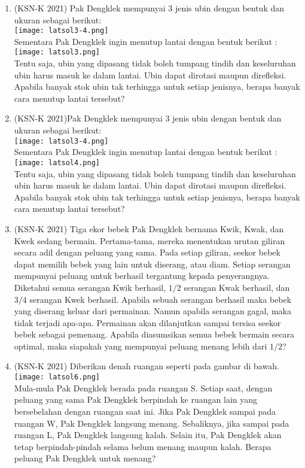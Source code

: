 \documentclass[11pt]{scrartcl}
\begin{document}
\begin{enumerate}
	 	    \item (KSN-K 2021) Pak Dengklek mempunyai 3 jenis ubin dengan bentuk dan ukuran sebagai berikut:\\
	 	    	\texttt{[image: latsol3-4.png]}\\
	 	    Sementara Pak Dengklek ingin menutup lantai dengan bentuk berikut :\\
	 	    	\texttt{[image: latsol3.png]}\\
	 	    Tentu saja, ubin yang dipasang tidak boleh tumpang tindih dan keseluruhan ubin harus 
	 	    masuk ke dalam lantai. Ubin dapat dirotasi maupun direfleksi. Apabila banyak stok ubin 
	 	    tak terhingga untuk setiap jenisnya, berapa banyak cara menutup lantai tersebut?
	 	    
	 	    \item (KSN-K 2021)Pak Dengklek mempunyai 3 jenis ubin dengan bentuk dan ukuran sebagai berikut:\\
	 	     	 \texttt{[image: latsol3-4.png]}\\
	 	    Sementara Pak Dengklek ingin menutup lantai dengan bentuk berikut :\\
	 	    	\texttt{[image: latsol4.png]}\\
	 	    Tentu saja, ubin yang dipasang tidak boleh tumpang tindih dan keseluruhan ubin harus 
	 	    masuk ke dalam lantai. Ubin dapat dirotasi maupun direfleksi. Apabila banyak stok ubin 
	 	    tak terhingga untuk setiap jenisnya, berapa banyak cara menutup lantai tersebut?
	 	    
	 	    \item (KSN-K 2021) Tiga ekor bebek Pak Dengklek bernama Kwik, Kwak, dan Kwek sedang bermain. 
	 	    Pertama-tama, mereka menentukan urutan giliran secara adil dengan peluang yang 
	 	    sama. Pada setiap giliran, seekor bebek dapat memilih bebek yang lain untuk diserang,
	 	    atau diam. Setiap serangan mempunyai peluang untuk berhasil tergantung kepada
	 	    penyerangnya. Diketahui semua serangan Kwik berhasil, $1/2$ serangan Kwak berhasil, dan 
	 	    $3/4$ serangan Kwek berhasil. Apabila sebuah serangan berhasil maka bebek yang diserang 
	 	    keluar dari permainan. Namun apabila serangan gagal, maka tidak terjadi apa-apa.
	 	    Permainan akan dilanjutkan sampai tersisa seekor bebek sebagai pemenang. Apabila 
	 	    diasumsikan semua bebek bermain secara optimal, maka siapakah yang mempunyai 
	 	    peluang menang lebih dari $1/2$?
	 	    
	 	    \item (KSN-K 2021) Diberikan denah ruangan seperti pada gambar di bawah.\\
	 	    	\texttt{[image: latsol6.png]}\\
	 	    Mula-mula Pak Dengklek berada pada ruangan S. Setiap saat, dengan peluang yang 
	 	    sama Pak Dengklek berpindah ke ruangan lain yang bersebelahan dengan ruangan saat 
	 	    ini. Jika Pak Dengklek sampai pada ruangan W, Pak Dengklek langsung menang. 
	 	    Sebaliknya, jika sampai pada ruangan L, Pak Dengklek langsung kalah. Selain itu, Pak 
	 	    Dengklek akan tetap berpindah-pindah selama belum menang maupun kalah. Berapa 
	 	    peluang Pak Dengklek untuk menang?
	 	    

\end{enumerate}
\end{document}
